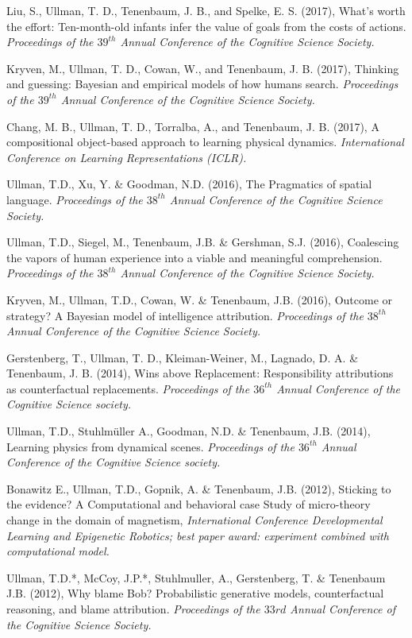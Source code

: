 \documentclass[margin,line,pifont,palatino,courier]{res}
\begin{document}
\begin{resume}
Liu, S., Ullman, T. D., Tenenbaum, J. B., and Spelke, E. S. (2017), What's worth the effort: Ten-month-old infants infer the value of goals from the costs of actions. \textit{Proceedings of the $39^{th}$ Annual Conference of the Cognitive Science Society.}

Kryven, M., Ullman, T. D., Cowan, W., and Tenenbaum, J. B. (2017), Thinking and guessing: Bayesian and empirical models of how humans search. \textit{Proceedings of the $39^{th}$ Annual Conference of the Cognitive Science Society.}

Chang, M. B., Ullman, T. D., Torralba, A., and Tenenbaum, J. B. (2017), A compositional object-based approach to learning physical dynamics. \textit{International Conference on Learning Representations (ICLR).}

Ullman, T.D., Xu, Y. \& Goodman, N.D. (2016), The Pragmatics of spatial language. \textit{Proceedings of the $38^{th}$ Annual Conference of the Cognitive Science Society.}

Ullman, T.D., Siegel, M., Tenenbaum, J.B. \& Gershman, S.J. (2016), Coalescing the vapors of human experience into a viable and meaningful comprehension. \textit{Proceedings of the $38^{th}$ Annual Conference of the Cognitive Science Society.}

Kryven, M., Ullman, T.D., Cowan, W. \& Tenenbaum, J.B. (2016), Outcome or strategy? A Bayesian model of intelligence attribution. \textit{Proceedings of the $38^{th}$ Annual Conference of the Cognitive Science Society.}

Gerstenberg, T., Ullman, T. D., Kleiman-Weiner, M., Lagnado, D. A. \& Tenenbaum, J. B. (2014), Wins above Replacement: Responsibility attributions as counterfactual replacements. \textit{Proceedings of the $36^{th}$ Annual Conference of the Cognitive Science society.}

Ullman, T.D., Stuhlm{\"u}ller A., Goodman, N.D. \& Tenenbaum, J.B. (2014), Learning physics from dynamical scenes. \textit{Proceedings of the $36^{th}$ Annual Conference of the Cognitive Science society.}

Bonawitz E., Ullman, T.D., Gopnik, A. \& Tenenbaum, J.B. (2012), Sticking to the evidence? A Computational and behavioral case Study of micro-theory change in the domain of magnetism, \textit{International Conference Developmental Learning and Epigenetic Robotics; best paper award: experiment combined with computational model.}

Ullman, T.D.*, McCoy, J.P.*, Stuhlmuller, A., Gerstenberg, T. \& Tenenbaum J.B. (2012), Why blame Bob? Probabilistic generative models, counterfactual reasoning, and blame attribution. \textit{Proceedings of the $33rd$ Annual Conference of the Cognitive Science Society.}


\end{resume}
\end{document}
